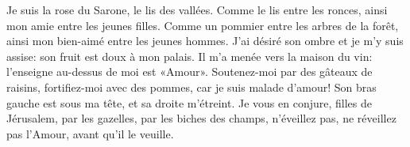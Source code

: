 Je suis la rose du Sarone, le lis des vallées.
Comme le lis entre les ronces,
	ainsi mon amie entre les jeunes filles.
Comme un pommier entre les arbres de la forêt,
	ainsi mon bien-aimé entre les jeunes hommes.
J’ai désiré son ombre et je m’y suis assise: son fruit est doux à mon palais.
	Il m’a menée vers la maison du vin: l’enseigne au-dessus de moi est «Amour».
Soutenez-moi par des gâteaux de raisins, fortifiez-moi avec des pommes,
	car je suis malade d’amour!
	Son bras gauche est sous ma tête, et sa droite m’étreint.
Je vous en conjure, filles de Jérusalem, par les gazelles, par les biches des champs,
	n’éveillez pas, ne réveillez pas l’Amour, avant qu’il le veuille.
